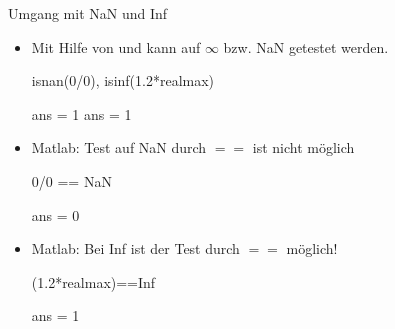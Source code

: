 \documentclass[hyperref={xetex}]{beamer}
\begin{document}
\begin{frame}[fragile]{Umgang mit NaN und       Inf  }
\begin{itemize}
\item Mit Hilfe von \alert{ } und \alert{ } kann auf
$\infty$ bzw. NaN getestet werden.
 \begin{matlabin}
isnan(0/0), isinf(1.2*realmax)
\end{matlabin}
\begin{matlab}
ans =   1  ans =   1
\end{matlab}
\item Matlab: Test auf NaN durch $==$ ist nicht m\"oglich
\begin{matlabin}
0/0 == NaN
\end{matlabin}
\begin{matlab}
ans =     0
\end{matlab}
\item Matlab: Bei Inf ist der Test durch $==$  m\"oglich!
\begin{matlabin}
(1.2*realmax)==Inf
\end{matlabin}
\begin{matlab}
ans =     1
\end{matlab}
\end{itemize}
\end{frame}
%
%
%
%
\end{document}
